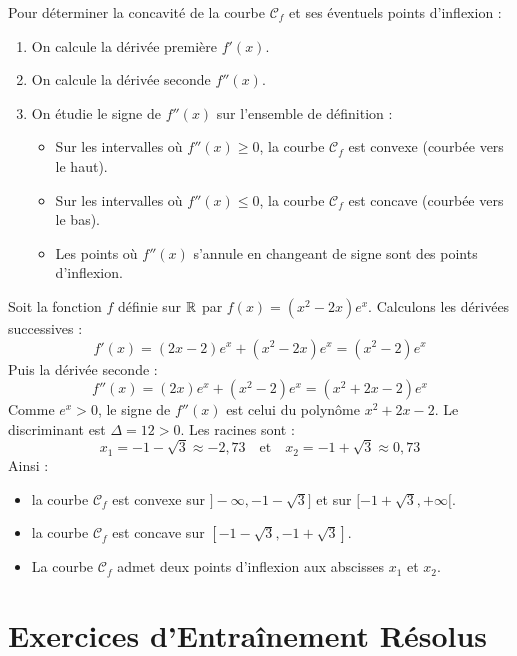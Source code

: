 \begin{methode}
Pour déterminer la concavité de la courbe $\mathcal{C}_f$ et ses éventuels points d'inflexion :
\begin{enumerate}
    \item On calcule la dérivée première $f'(x)$.
    \item On calcule la dérivée seconde $f''(x)$.
    \item On étudie le signe de $f''(x)$ sur l'ensemble de définition :
    \begin{itemize}
        \item Sur les intervalles où $f''(x) \ge 0$, la courbe $\mathcal{C}_f$ est convexe (courbée vers le haut).
        \item Sur les intervalles où $f''(x) \le 0$, la courbe $\mathcal{C}_f$ est concave (courbée vers le bas).
        \item Les points où $f''(x)$ s'annule en changeant de signe sont des points d'inflexion.
    \end{itemize}
\end{enumerate}
\end{methode}

\begin{exemple}
Soit la fonction $f$ définie sur $\mathbb{R}$ par $f(x) = (x^2-2x)e^x$.
Calculons les dérivées successives :
\[
f'(x) = (2x-2)e^x + (x^2-2x)e^x = (x^2-2)e^x
\]
Puis la dérivée seconde :
\[
f''(x) = (2x)e^x + (x^2-2)e^x = (x^2+2x-2)e^x
\]
Comme $e^x > 0$, le signe de $f''(x)$ est celui du polynôme $x^2+2x-2$. Le discriminant est $\Delta = 12 > 0$. Les racines sont :
\[
x_1 = -1-\sqrt{3} \approx -2,73 \quad \text{et} \quad x_2 = -1+\sqrt{3} \approx 0,73
\]
Ainsi :
\begin{itemize}
    \item la courbe $\mathcal{C}_f$ est convexe sur $]-\infty, -1-\sqrt{3}]$ et sur $[-1+\sqrt{3}, +\infty[$.
    \item la courbe $\mathcal{C}_f$ est concave sur $[-1-\sqrt{3}, -1+\sqrt{3}]$.
    \item La courbe $\mathcal{C}_f$ admet deux points d'inflexion aux abscisses $x_1$ et $x_2$.
\end{itemize}
\end{exemple}

\section{Exercices d'Entraînement Résolus}

